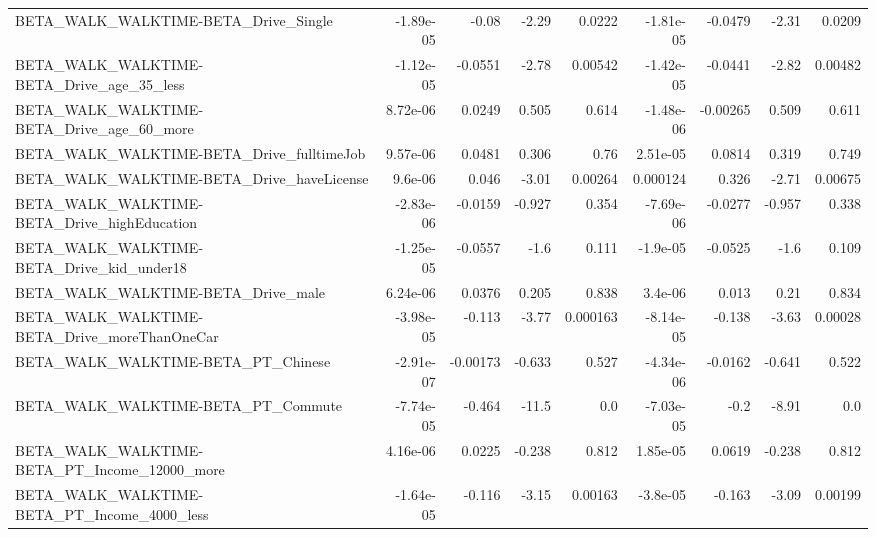 \begin{tabular}{lrrrrrrrr}
BETA\_WALK\_WALKTIME-BETA\_Drive\_Single               &   -1.89e-05 &        -0.08 &     -2.29 &   0.0222 &  -1.81e-05 &     -0.0479 &        -2.31 &        0.0209 \\
BETA\_WALK\_WALKTIME-BETA\_Drive\_age\_35\_less          &   -1.12e-05 &      -0.0551 &     -2.78 &  0.00542 &  -1.42e-05 &     -0.0441 &        -2.82 &       0.00482 \\
BETA\_WALK\_WALKTIME-BETA\_Drive\_age\_60\_more          &    8.72e-06 &       0.0249 &     0.505 &    0.614 &  -1.48e-06 &    -0.00265 &        0.509 &         0.611 \\
BETA\_WALK\_WALKTIME-BETA\_Drive\_fulltimeJob          &    9.57e-06 &       0.0481 &     0.306 &     0.76 &   2.51e-05 &      0.0814 &        0.319 &         0.749 \\
BETA\_WALK\_WALKTIME-BETA\_Drive\_haveLicense          &     9.6e-06 &        0.046 &     -3.01 &  0.00264 &   0.000124 &       0.326 &        -2.71 &       0.00675 \\
BETA\_WALK\_WALKTIME-BETA\_Drive\_highEducation        &   -2.83e-06 &      -0.0159 &    -0.927 &    0.354 &  -7.69e-06 &     -0.0277 &       -0.957 &         0.338 \\
BETA\_WALK\_WALKTIME-BETA\_Drive\_kid\_under18          &   -1.25e-05 &      -0.0557 &      -1.6 &    0.111 &   -1.9e-05 &     -0.0525 &         -1.6 &         0.109 \\
BETA\_WALK\_WALKTIME-BETA\_Drive\_male                 &    6.24e-06 &       0.0376 &     0.205 &    0.838 &    3.4e-06 &       0.013 &         0.21 &         0.834 \\
BETA\_WALK\_WALKTIME-BETA\_Drive\_moreThanOneCar       &   -3.98e-05 &       -0.113 &     -3.77 & 0.000163 &  -8.14e-05 &      -0.138 &        -3.63 &       0.00028 \\
BETA\_WALK\_WALKTIME-BETA\_PT\_Chinese                 &   -2.91e-07 &     -0.00173 &    -0.633 &    0.527 &  -4.34e-06 &     -0.0162 &       -0.641 &         0.522 \\
BETA\_WALK\_WALKTIME-BETA\_PT\_Commute                 &   -7.74e-05 &       -0.464 &     -11.5 &      0.0 &  -7.03e-05 &        -0.2 &        -8.91 &           0.0 \\
BETA\_WALK\_WALKTIME-BETA\_PT\_Income\_12000\_more       &    4.16e-06 &       0.0225 &    -0.238 &    0.812 &   1.85e-05 &      0.0619 &       -0.238 &         0.812 \\
BETA\_WALK\_WALKTIME-BETA\_PT\_Income\_4000\_less        &   -1.64e-05 &       -0.116 &     -3.15 &  0.00163 &   -3.8e-05 &      -0.163 &        -3.09 &       0.00199 \\

\end{tabular}
